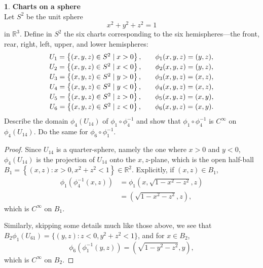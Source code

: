 \documentclass[12pt]{article}
\theoremstyle{definition}
\newtheorem{ex}{}[section]
\begin{document}
\begin{ex}
	\textbf{Charts on a sphere} \\
	Let $S^2$ be the unit sphere \begin{equation*}
		x^2 + y^2 + z^2 = 1
	\end{equation*}
	in $\mathbb{R}^3$.
	Define in $S^2$ the six charts corresponding to the six hemispheres---the front, rear, right, left, upper, and lower hemispheres: \begin{equation*}
		\begin{array}{c@{\qquad}c}
			U_1 = \left\lbrace (x, y, z) \in S^2 \mid x > 0 \right\rbrace, & \phi_1(x, y, z) = (y, z), \\[2pt]
			U_2 = \left\lbrace (x, y, z) \in S^2 \mid x < 0 \right\rbrace, & \phi_2(x, y, z) = (y, z), \\[2pt]
			U_3 = \left\lbrace (x, y, z) \in S^2 \mid y > 0 \right\rbrace, & \phi_3(x, y, z) = (x, z), \\[2pt]
			U_4 = \left\lbrace (x, y, z) \in S^2 \mid y < 0 \right\rbrace, & \phi_4(x, y, z) = (x, z), \\[2pt]
			U_5 = \left\lbrace (x, y, z) \in S^2 \mid z > 0 \right\rbrace, & \phi_5(x, y, z) = (x, y), \\[2pt]
			U_6 = \left\lbrace (x, y, z) \in S^2 \mid z < 0 \right\rbrace, & \phi_6(x, y, z) = (x, y).
		\end{array}
	\end{equation*}
	Describe the domain $\phi_4(U_{14})$ of $\phi_1 \circ \phi_4^{-1}$ and show that $\phi_1 \circ \phi_4^{-1}$ is $C^\infty$ on $\phi_4(U_{14})$.
	Do the same for $\phi_6 \circ \phi_1^{-1}$.
\end{ex}
\begin{proof}
	Since $U_{14}$ is a quarter-sphere, namely the one where $x > 0$ and $y < 0$, $\phi_4(U_{14})$ is the projection of $U_{14}$ onto the $x,z$-plane, which is the open half-ball $B_1 = \left\lbrace (x, z) : x > 0, x^2 + z^2 < 1 \right\rbrace \in \mathbb{R}^2$.
	Explicitly, if $(x, z) \in B_1$, \begin{align*}
		\phi_1(\phi_4^{-1}(x, z)) & = \phi_1(x, \sqrt{1 - x^2 - z^2}, z) \\
		                          & = (\sqrt{1 - x^2 - z^2}, z),
	\end{align*}
	which is $C^\infty$ on $B_1$.

	Similarly, skipping some details much like those above, we see that $B_2 \phi_1\left(U_{61}\right) = \lbrace (y, z) : z < 0, y^2 + z^2 < 1 \rbrace$, and for $x \in B_2$, \begin{equation*}
		\phi_6(\phi_1^{-1}(y, z)) = \left( \sqrt{1 - y^2 - z^2}, y \right),
	\end{equation*}
	which is $C^\infty$ on $B_2$.
\end{proof}
\end{document}
